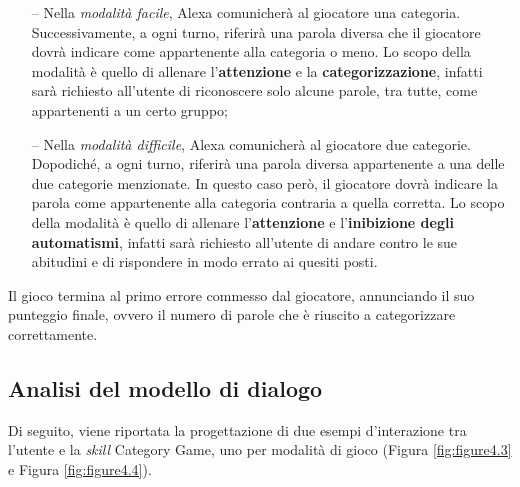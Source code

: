 \begin{itemize}
  \item[--] Nella \textit{modalità facile}, Alexa comunicherà al giocatore una
        categoria. Successivamente, a ogni turno, riferirà una parola diversa
        che il giocatore dovrà indicare come appartenente alla categoria o meno.
        Lo scopo della modalità è quello di allenare l’\textbf{attenzione} e la
        \textbf{categorizzazione}, infatti sarà richiesto all’utente di
        riconoscere solo alcune parole, tra tutte, come appartenenti a un
        certo gruppo;
  \item[--] Nella \textit{modalità difficile}, Alexa comunicherà al giocatore
        due categorie. Dopodiché, a ogni turno, riferirà una parola diversa
        appartenente a una delle due categorie menzionate. In questo caso però,
        il giocatore dovrà indicare la parola come appartenente alla categoria
        contraria a quella corretta.
        Lo scopo della modalità è quello di allenare l’\textbf{attenzione} e
        l’\textbf{inibizione degli automatismi}, infatti sarà richiesto
        all’utente di andare contro le sue abitudini e di rispondere in modo
        errato ai quesiti posti.
\end{itemize}

Il gioco termina al primo errore commesso dal giocatore, annunciando il suo
punteggio finale, ovvero il numero di parole che è riuscito a categorizzare
correttamente.

\subsection{Analisi del modello di dialogo}
\label{subsec:Sezione4.2.1}

Di seguito, viene riportata la progettazione di due esempi d'interazione tra
l’utente e la \textit{skill} Category Game, uno per modalità di gioco (Figura
\ref{fig:figure4.3} e Figura \ref{fig:figure4.4}). \newpage


